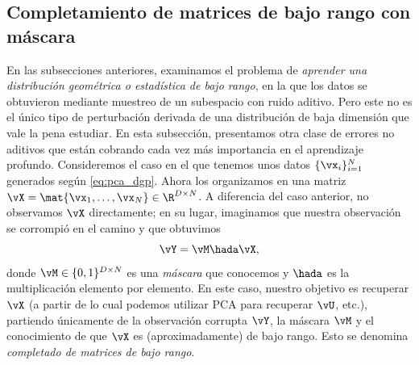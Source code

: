 \documentclass[../../book-main.tex]{subfiles}
\begin{document}
\subsection{Completamiento de matrices de bajo rango con máscara}

En las subsecciones anteriores, examinamos el problema de \textit{aprender 
una distribución geométrica o estadística de bajo rango}, en la que los 
datos se obtuvieron mediante muestreo de un subespacio con ruido aditivo. Pero
este no es el único tipo de perturbación derivada de una distribución de baja dimensión
que vale la pena estudiar. En esta subsección, presentamos otra clase de errores 
no aditivos que están cobrando cada vez más importancia en el aprendizaje profundo.
Consideremos el caso en el que tenemos unos datos \(\{\vx_{i}\}_{i = 1}^{N}\) generados
según \eqref{eq:pca_dgp}. Ahora los organizamos en una matriz
\(\vX = \mat{\vx_{1}, \dots, \vx_{N}} \in \R^{D \times N}\). A diferencia del
caso anterior, no observamos \(\vX\) directamente; en su lugar, imaginamos que
nuestra observación se corrompió en el camino y que obtuvimos
\begin{equation}
    \vY = \vM \hada \vX,
\end{equation}
donde \(\vM \in \{0, 1\}^{D \times N}\) es una \textit{máscara} que conocemos
y \(\hada\) es la multiplicación elemento por elemento. En este caso, nuestro objetivo
es recuperar \(\vX\) (a partir de lo cual podemos utilizar PCA para recuperar
\(\vU\), etc.), partiendo únicamente de la observación corrupta \(\vY\), la máscara
\(\vM\) y el conocimiento de que \(\vX\) es (aproximadamente) de bajo rango.
Esto se denomina \textit{completado de matrices de bajo rango}. 
\end{document}
